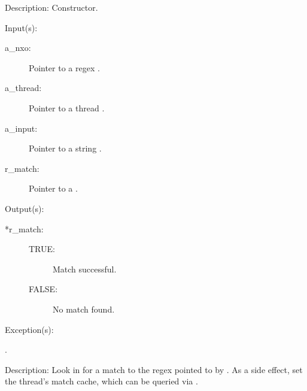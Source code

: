 \begin{capi}
\begin{capilist}
	\item[Description: ]
		Constructor.
	\end{capilist}
\label{nxo_regex_match}
	\begin{capilist}
	\item[Input(s): ]
		\begin{description}\item[]
		\item[a\_nxo: ]
			Pointer to a regex .
		\item[a\_thread: ]
			Pointer to a thread .
		\item[a\_input: ]
			Pointer to a string .
		\item[r\_match: ]
			Pointer to a .
		\end{description}
	\item[Output(s): ]
		\begin{description}\item[]
		\item[*r\_match: ]
			\begin{description}\item[]
			\item[TRUE: ] Match successful.
			\item[FALSE: ] No match found.
			\end{description}
		\end{description}
	\item[Exception(s): ]
		\begin{description}\item[]
		\item[.]
		\end{description}
	\item[Description: ]
		Look in  for a match to the regex pointed to by
		.  As a side effect, set the thread's match cache,
		which can be queried via .
	\end{capilist}
\label{nxo_regex_nonew_match}

\end{capi}
